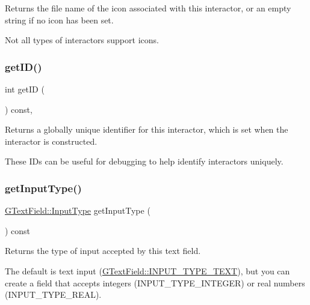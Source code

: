 Returns the file name of the icon associated with this interactor, or an empty string if no icon has been set. 

Not all types of interactors support icons. \mbox{\label{classGInteractor_a9c9659a6c6ba66b4107ba59c95a24241}} 
\subsubsection{\texorpdfstring{get\+I\+D()}{getID()}}
{\footnotesize\ttfamily int get\+ID (\begin{DoxyParamCaption}{ }\end{DoxyParamCaption}) const\hspace{0.3cm}{\ttfamily [virtual]}, {\ttfamily [inherited]}}



Returns a globally unique identifier for this interactor, which is set when the interactor is constructed. 

These I\+Ds can be useful for debugging to help identify interactors uniquely. \mbox{\label{classGTextField_a69cc7c223d780203ab2852ee5a881753}} 
\subsubsection{\texorpdfstring{get\+Input\+Type()}{getInputType()}}
{\footnotesize\ttfamily \mbox{\hyperlink{classGTextField_a5fc772c800c3d40d2b95564e8a839bab}{G\+Text\+Field\+::\+Input\+Type}} get\+Input\+Type (\begin{DoxyParamCaption}{ }\end{DoxyParamCaption}) const\hspace{0.3cm}{\ttfamily [virtual]}}



Returns the type of input accepted by this text field. 

The default is text input (\mbox{\hyperlink{classGTextField_a5fc772c800c3d40d2b95564e8a839babadbd6303eaf17fd7715ddca85f2ac3287}{G\+Text\+Field\+::\+I\+N\+P\+U\+T\+\_\+\+T\+Y\+P\+E\+\_\+\+T\+E\+XT}}), but you can create a field that accepts integers (I\+N\+P\+U\+T\+\_\+\+T\+Y\+P\+E\+\_\+\+I\+N\+T\+E\+G\+ER) or real numbers (I\+N\+P\+U\+T\+\_\+\+T\+Y\+P\+E\+\_\+\+R\+E\+AL). \mbox{\label{classGTextField_a2f6b36b2517087dc90a366b5ce1f5323}} 
